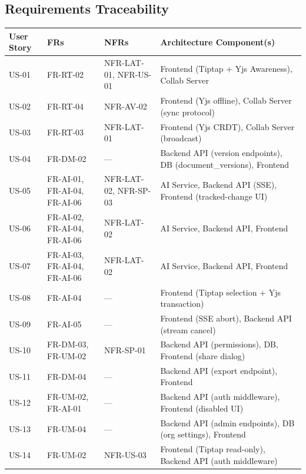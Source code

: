 \documentclass{article}
\begin{document}
\subsection{Requirements Traceability}
\noindent
{\small
\begin{tabularx}{\textwidth}{|>{\hsize=0.2\hsize\raggedright\arraybackslash}X|>{\hsize=0.4\hsize\raggedright\arraybackslash}X|>{\hsize=0.4\hsize\raggedright\arraybackslash}X|>{\hsize=1\hsize\raggedright\arraybackslash}X|}
    \hline
    \rowcolor{tableBlue}
    \textbf{\color{white}User Story} &
    \textbf{\color{white}FRs} &
    \textbf{\color{white}NFRs} &
    \textbf{\color{white}Architecture Component(s)} \\
    \hline
    US-01 & FR-RT-02 & NFR-LAT-01, NFR-US-01 & Frontend (Tiptap + Yjs Awareness), Collab Server \\
    \hline
    US-02 & FR-RT-04 & NFR-AV-02 & Frontend (Yjs offline), Collab Server (sync protocol) \\
    \hline
    US-03 & FR-RT-03 & NFR-LAT-01 & Frontend (Yjs CRDT), Collab Server (broadcast) \\
    \hline
    US-04 & FR-DM-02 & — & Backend API (version endpoints), DB (document\_versions), Frontend \\
    \hline
    US-05 & FR-AI-01, FR-AI-04, FR-AI-06 & NFR-LAT-02, NFR-SP-03 & AI Service, Backend API (SSE), Frontend (tracked-change UI) \\
    \hline
    US-06 & FR-AI-02, FR-AI-04, FR-AI-06 & NFR-LAT-02 & AI Service, Backend API, Frontend \\
    \hline
    US-07 & FR-AI-03, FR-AI-04, FR-AI-06 & NFR-LAT-02 & AI Service, Backend API, Frontend \\
    \hline
    US-08 & FR-AI-04 & — & Frontend (Tiptap selection + Yjs transaction) \\
    \hline
    US-09 & FR-AI-05 & — & Frontend (SSE abort), Backend API (stream cancel) \\
    \hline
    US-10 & FR-DM-03, FR-UM-02 & NFR-SP-01 & Backend API (permissions), DB, Frontend (share dialog) \\
    \hline
    US-11 & FR-DM-04 & — & Backend API (export endpoint), Frontend \\
    \hline
    US-12 & FR-UM-02, FR-AI-01 & — & Backend API (auth middleware), Frontend (disabled UI) \\
    \hline
    US-13 & FR-UM-04 & — & Backend API (admin endpoints), DB (org settings), Frontend \\
    \hline
    US-14 & FR-UM-02 & NFR-US-03 & Frontend (Tiptap read-only), Backend API (auth middleware) \\
    \hline
\end{tabularx}
}
\end{document}
